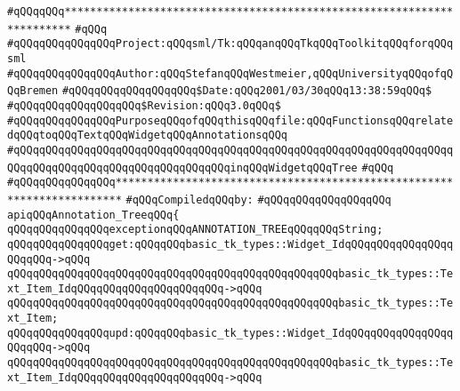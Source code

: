 \label{src/lib/tk/src/text_item_tree.api}
\verb|#qQQqqQQq***********************************************************************|\newline
\verb|#qQQq|\newline
\verb|#qQQqqQQqqQQqqQQqProject:qQQqsml/Tk:qQQqanqQQqTkqQQqToolkitqQQqforqQQqsml|\newline
\verb|#qQQqqQQqqQQqqQQqAuthor:qQQqStefanqQQqWestmeier,qQQqUniversityqQQqofqQQqBremen|\newline
\verb|#qQQqqQQqqQQqqQQqqQQq$Date:qQQq2001/03/30qQQq13:38:59qQQq$|\newline
\verb|#qQQqqQQqqQQqqQQqqQQq$Revision:qQQq3.0qQQq$|\newline
\verb|#qQQqqQQqqQQqqQQqPurposeqQQqofqQQqthisqQQqfile:qQQqFunctionsqQQqrelatedqQQqtoqQQqTextqQQqWidgetqQQqAnnotationsqQQq|\newline
\verb|#qQQqqQQqqQQqqQQqqQQqqQQqqQQqqQQqqQQqqQQqqQQqqQQqqQQqqQQqqQQqqQQqqQQqqQQqqQQqqQQqqQQqqQQqqQQqqQQqqQQqqQQqinqQQqWidgetqQQqTree|\newline
\verb|#qQQq|\newline
\verb|#qQQqqQQqqQQqqQQq***********************************************************************|\newline
\newline
\verb|#qQQqCompiledqQQqby:|\newline
\verb|#qQQqqQQqqQQqqQQqqQQq|\newline
\newline
\verb|apiqQQqAnnotation_TreeqQQq{|\newline
\newline
\verb|qQQqqQQqqQQqqQQqexceptionqQQqANNOTATION_TREEqQQqqQQqString;|\newline
\newline
\verb|qQQqqQQqqQQqqQQqget:qQQqqQQqbasic_tk_types::Widget_IdqQQqqQQqqQQqqQQqqQQqqQQq->qQQq|\newline
\verb|qQQqqQQqqQQqqQQqqQQqqQQqqQQqqQQqqQQqqQQqqQQqqQQqqQQqbasic_tk_types::Text_Item_IdqQQqqQQqqQQqqQQqqQQqqQQq->qQQq|\newline
\verb|qQQqqQQqqQQqqQQqqQQqqQQqqQQqqQQqqQQqqQQqqQQqqQQqqQQqbasic_tk_types::Text_Item;|\newline
\newline
\verb|qQQqqQQqqQQqqQQqupd:qQQqqQQqbasic_tk_types::Widget_IdqQQqqQQqqQQqqQQqqQQqqQQq->qQQq|\newline
\verb|qQQqqQQqqQQqqQQqqQQqqQQqqQQqqQQqqQQqqQQqqQQqqQQqqQQqbasic_tk_types::Text_Item_IdqQQqqQQqqQQqqQQqqQQqqQQq->qQQq|\newline
